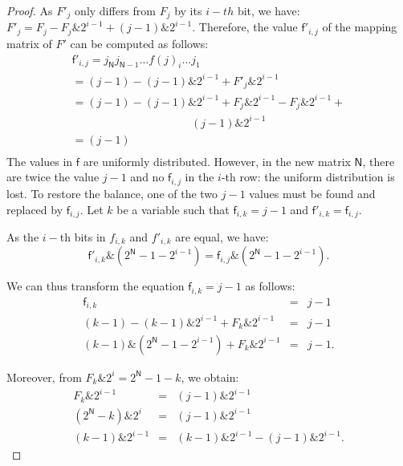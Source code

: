 \documentclass[conference]{IEEEtran}
\begin{document}
\begin{proof}
As $F'_j$ only differs from $F_j$ by its $i-th$ bit, we have: $F'_j=F_j-F_j\&2^{i-1}+(j-1)\&2^{i-1}.$
Therefore, the value $\mathsf{f}'_{i,j}$ of the mapping matrix of $F'$ can be computed as follows:
\begin{equation}
\label{eq2}
\begin{array}{l}
\mathsf{f}'_{i,j}=j_\mathsf{N}j_{\mathsf{N}-1}...f(j)_i...j_1 \\
=(j-1)-(j-1)\&2^{i-1}+F'_j\&2^{i-1}\\
=(j-1)-(j-1)\&2^{i-1}+F_j\&2^{i-1}-F_j\&2^{i-1}+\\
 ~~~~~~~~~~~~~~~~~~~~~~~~~~~~~~~~~~~~~~~~~~~~~~~~(j-1)\&2^{i-1}\\
=(j-1)\\
\end{array}
\end{equation}
The values in $\mathsf{f}$ are uniformly distributed.
However, in the new matrix $\mathsf{N}$, there are twice the value $j-1$ and no $\mathsf{f}_{i,j}$ in the $i$-th row: the uniform distribution is lost. 
To restore the balance, one of the two $j-1$ values must be found and replaced by $\mathsf{f}_{i,j}$. Let $k$ be a variable such that $\mathsf{f}_{i,k}=j-1$ and $\mathsf{f}'_{i,k}=\mathsf{f}_{i,j}$.


As the $i-$th bits in ${f}_{i,k}$ and ${f}'_{i,k}$ are equal, we have:
\begin{equation}
\label{eq5}
\mathsf{f}'_{i,k}\&(2^\mathsf{N}-1-2^{i-1})=\mathsf{f}_{i,j}\&(2^\mathsf{N}-1-2^{i-1}).
\end{equation}

We can thus transform the equation $\mathsf{f}_{i,k}=j-1$ as follows:
\begin{equation}
\label{eq6}
\begin{array}{lll}
\mathsf{f}_{i,k}&=&j-1\\
(k-1)-(k-1)\&2^{i-1}+F_k\&2^{i-1}& =&j-1\\
(k-1)\&(2^\mathsf{N}-1-2^{i-1})+F_k\&2^{i-1}&=&j-1.
\end{array}
\end{equation}

Moreover, from $F_k\&2^i = 2^\mathsf{N}-1-k$, we obtain:
\begin{equation}
\label{eq7}
\begin{array}{lll}
F_k\&2^{i-1}&=&(j-1)\&2^{i-1} \\
(2^\mathsf{N}-k)\&2^i&=&(j-1)\&2^{i-1}\\
(k-1)\&2^{i-1}&=&(k-1)\&2^{i-1}-(j-1)\&2^{i-1}.
\end{array}
\end{equation}


\end{proof}
\end{document}
